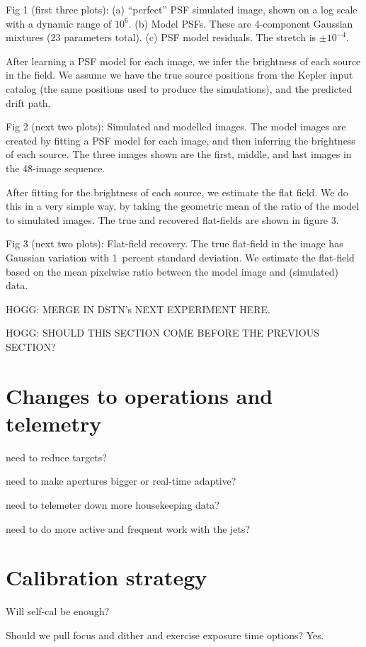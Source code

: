 \documentclass[letterpaper,12pt,preprint]{aastex}
\begin{document}
Fig 1 (first three plots): (a) ``perfect'' PSF simulated image, shown on a log scale with a dynamic range of $10^6$. (b) Model PSFs.  These are 4-component Gaussian mixtures (23 parameters total).  (c) PSF model residuals.  The stretch is $\pm 10^{-4}$.

After learning a PSF model for each image, we infer the brightness of each source in the field.  We assume we have the true source positions from the Kepler input catalog (the same positions used to produce the simulations), and the predicted drift path.

Fig 2 (next two plots): Simulated and modelled images.  The model images are created by fitting a PSF model for each image, and then inferring the brightness of each source.  The three images shown are the first, middle, and last images in the 48-image sequence.

After fitting for the brightness of each source, we estimate the flat field.  We do this in a very simple way, by taking the geometric mean of the ratio of the model to simulated images.  The true and recovered flat-fields are shown in figure 3.

Fig 3 (next two plots): Flat-field recovery.  The true flat-field in the image has Gaussian variation with 1~percent standard deviation.  We estimate the flat-field based on the mean pixelwise ratio between the model image and (simulated) data.

HOGG: MERGE IN DSTN's NEXT EXPERIMENT HERE.

HOGG: SHOULD THIS SECTION COME BEFORE THE PREVIOUS SECTION?

\section{Changes to operations and telemetry}\label{sec:operations}

need to reduce targets?

need to make apertures bigger or real-time adaptive?

need to telemeter down more housekeeping data?

need to do more active and frequent work with the jets?

\section{Calibration strategy}\label{sec:calibration}

Will self-cal be enough?

Should we pull focus and dither and exercise exposure time options?  Yes.
\end{document}
